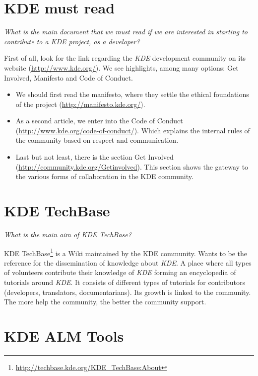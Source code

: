\documentclass[11pt]{scrartcl}
\begin{document}
\section{KDE must read}
\label{sec:q-01}

\emph{What is the main document that we must read if we are interested in starting to contribute to a \emph{KDE} project, as a developer?}

\par First of all, look for the link regarding the \emph{KDE} development community on its website (\url{http://www.kde.org/}). We see highlights, among many options: Get Involved, Manifesto and Code of Conduct.

\begin{itemize}

	\item We should first read the manifesto, where they settle the ethical foundations of the project (\url{http://manifesto.kde.org/}).
	\item As a second article, we enter into the Code of Conduct (\url{http://www.kde.org/code-of-conduct/}). Which explains the internal rules of the community based on respect and communication.
	\item Last but not least, there is the section Get Involved (\url{http://community.kde.org/Getinvolved}). This section shows the gateway to the various forms of collaboration in the KDE community.
\end{itemize}

\section{KDE TechBase}
\label{sec:q-02}

\emph{What is the main aim of \emph{KDE TechBase}?}

KDE TechBase\footnote{\url{http://techbase.kde.org/KDE_TechBase:About}} is a Wiki maintained by the KDE community. Wants to be the reference for the dissemination of knowledge about \emph{KDE}. A place where all types of volunteers contribute their knowledge of \emph{KDE} forming an encyclopedia of tutorials around \emph{KDE}. It consists of different types of tutorials for contributors (developers, translators, documentarians). Its growth is linked to the community. The more help the community, the better the community support.


\section{KDE ALM Tools}
\label{sec:q-03}
\end{document}
